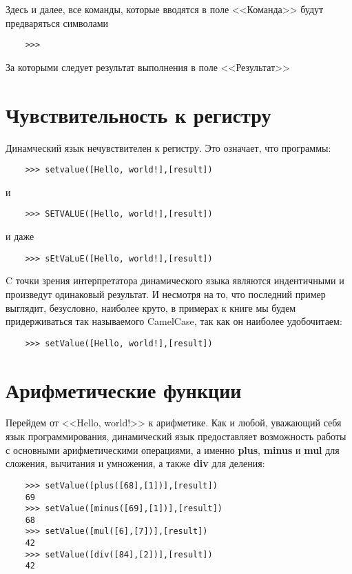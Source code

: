\documentclass[../index.tex]{subfiles}
\begin{document}
	Здесь и далее, все команды, которые вводятся в поле <<Команда>> будут предваряться символами 	\begin{verbatim}
	>>>
	\end{verbatim}	За которыми следует результат выполнения в поле <<Результат>>
	
	\section{Чувствительность к регистру}
	
	Динамческий язык нечувствителен к регистру. Это означает, что программы:
	
	\begin{verbatim}
	>>> setvalue([Hello, world!],[result])
	\end{verbatim}
	
	и
	
	\begin{verbatim}
	>>> SETVALUE([Hello, world!],[result])
	\end{verbatim}
	
	и даже
	
	\begin{verbatim}
	>>> sEtVaLuE([Hello, world!],[result])
	\end{verbatim}
	
	C точки зрения интерпретатора динамического языка являются индентичными и произведут одинаковый результат. И несмотря на то, что последний пример выглядит, безусловно, наиболее круто, в примерах к книге мы будем придерживаться так называемого CamelCase, так как он наиболее удобочитаем:
	
	\begin{verbatim}
	>>> setValue([Hello, world!],[result])
	\end{verbatim}
	
	\section{Арифметические функции}
	
	Перейдем от <<Hello, world!>> к арифметике. Как и любой, уважающий себя язык программирования, динамический язык предоставляет возможность работы с основными арифметическими операциями, а именно {\bf plus}, {\bf minus} и {\bf mul} для сложения, вычитания и умножения, а также {\bf div} для деления:
	
	\begin{verbatim}
	>>> setValue([plus([68],[1])],[result])
	69
	>>> setValue([minus([69],[1])],[result])
	68
	>>> setValue([mul([6],[7])],[result])
	42
	>>> setValue([div([84],[2])],[result])
	42
	\end{verbatim}
	
\end{document}

